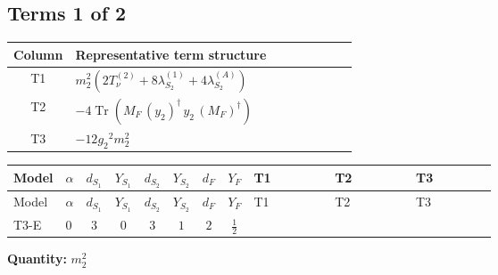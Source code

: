 \documentclass[8pt]{article}
\begin{document}
\begin{landscape}
\subsection*{Terms 1 of 2}
\begin{center}
\begin{tabular}{@{}c >{\raggedright\arraybackslash}p{0.82\linewidth}@{}}
\toprule
Column & Representative term structure \\
\midrule
T1 & \(\displaystyle {m_2^2} (2 T_{\nu}^{(2)}+8 {\lambda_{S_2}^{(1)}}+4 {\lambda_{S_2}^{(A)}})\) \\
\midrule
T2 & \(\displaystyle -4 \operatorname{Tr}\!\left({M_F}\,\left({y_2}\right)^{\dagger}\,{y_2}\,\left({M_F}\right)^{\dagger}\right)\) \\
\midrule
T3 & \(\displaystyle -12 {g_2}^2 {m_2^2}\) \\
\midrule
\bottomrule
\end{tabular}
\end{center}
\smallskip
\tiny
\begin{longtable}{@{}llcccccc >{\raggedright\arraybackslash}p{0.21\linewidth} >{\raggedright\arraybackslash}p{0.21\linewidth} >{\raggedright\arraybackslash}p{0.21\linewidth}@{}}
\toprule
Model & $\alpha$ & $d_{S_1}$ & $Y_{S_1}$ & $d_{S_2}$ & $Y_{S_2}$ & $d_F$ & $Y_F$ & T1 & T2 & T3 \\
\midrule
\endfirsthead
\toprule
Model & $\alpha$ & $d_{S_1}$ & $Y_{S_1}$ & $d_{S_2}$ & $Y_{S_2}$ & $d_F$ & $Y_F$ & T1 & T2 & T3 \\
\midrule
\endhead
T3-E & $0$ & $3$ & $0$ & $3$ & $1$ & $2$ & $\frac{1}{2}$ & \scriptsize\adjustbox{max width=\linewidth}{$\begin{gathered} {m_2^2} (2 T_{\nu}^{(2)}+8 {\lambda_{S_2}^{(1)}}+4 {\lambda_{S_2}^{(A)}})\end{gathered}$} & \scriptsize\adjustbox{max width=\linewidth}{$\begin{gathered} -4 \operatorname{Tr}\!\left({M_F}\,\left({y_2}\right)^{\dagger}\,{y_2}\,\left({M_F}\right)^{\dagger}\right)\end{gathered}$} & \scriptsize\adjustbox{max width=\linewidth}{$\begin{gathered} -12 {g_2}^2 {m_2^2}\end{gathered}$} \\
\midrule
\bottomrule
\end{longtable}
\clearpage
\noindent\textbf{Quantity: }$m_2^2$\par\smallskip

\end{landscape}
\end{document}
